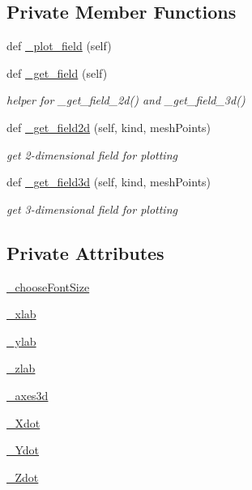 \subsection*{Private Member Functions}
\begin{DoxyCompactItemize}
\item 
def \hyperlink{class_mu_mo_t_1_1_mu_mo_tfield_view_a50d59419298116f738a98c864afb9d89}{\+\_\+plot\+\_\+field} (self)
\item 
def \hyperlink{class_mu_mo_t_1_1_mu_mo_tfield_view_aefbf0e354438e17ab6d48e2d368f8540}{\+\_\+get\+\_\+field} (self)
\begin{DoxyCompactList}\small\item\em helper for \+\_\+get\+\_\+field\+\_\+2d() and \+\_\+get\+\_\+field\+\_\+3d() \end{DoxyCompactList}\item 
def \hyperlink{class_mu_mo_t_1_1_mu_mo_tfield_view_a854f5f5badcda687eff8a999e6700cb7}{\+\_\+get\+\_\+field2d} (self, kind, mesh\+Points)
\begin{DoxyCompactList}\small\item\em get 2-\/dimensional field for plotting \end{DoxyCompactList}\item 
def \hyperlink{class_mu_mo_t_1_1_mu_mo_tfield_view_a7e92a660924e058d070dd1799c27f126}{\+\_\+get\+\_\+field3d} (self, kind, mesh\+Points)
\begin{DoxyCompactList}\small\item\em get 3-\/dimensional field for plotting \end{DoxyCompactList}\end{DoxyCompactItemize}
\subsection*{Private Attributes}
\begin{DoxyCompactItemize}
\item 
\hyperlink{class_mu_mo_t_1_1_mu_mo_tfield_view_a6a353a1ef9443ae375948d592ed6cec6}{\+\_\+choose\+Font\+Size}
\item 
\hyperlink{class_mu_mo_t_1_1_mu_mo_tfield_view_a865b2109ba10d874e84d4a354873b121}{\+\_\+xlab}
\item 
\hyperlink{class_mu_mo_t_1_1_mu_mo_tfield_view_aac1a25a634d53e524573f67eb5f3a7b9}{\+\_\+ylab}
\item 
\hyperlink{class_mu_mo_t_1_1_mu_mo_tfield_view_afcc07605f40039b605802f93b39ea910}{\+\_\+zlab}
\item 
\hyperlink{class_mu_mo_t_1_1_mu_mo_tfield_view_a506ccaeadc9c6f4102cf4e06f5a6be2a}{\+\_\+axes3d}
\item 
\hyperlink{class_mu_mo_t_1_1_mu_mo_tfield_view_a0f5fba57766067c941f5a96b22545ed4}{\+\_\+\+Xdot}
\item 
\hyperlink{class_mu_mo_t_1_1_mu_mo_tfield_view_a31f5ad9d4a349b00e06772177200c217}{\+\_\+\+Ydot}
\item 
\hyperlink{class_mu_mo_t_1_1_mu_mo_tfield_view_a4008c2e6651cb1bf1c9c1af3e962a25d}{\+\_\+\+Zdot}
\end{DoxyCompactItemize}
